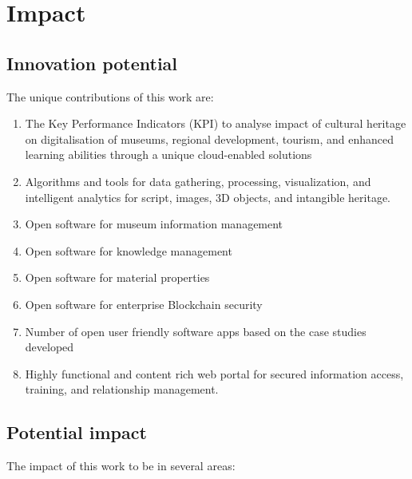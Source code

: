 %
\clearpage
\section{Impact}
\subsection{Innovation potential}
The unique contributions of this work are:
\begin{enumerate}[nosep]
\item The Key Performance Indicators (KPI) to analyse impact of cultural heritage on digitalisation of museums, regional development, tourism, and enhanced learning abilities through a unique cloud-enabled solutions
\item Algorithms and tools for data gathering, processing, visualization, and intelligent  analytics for script, images, 3D objects, and intangible heritage.
\item Open software for museum information management
\item Open software for knowledge management
\item Open software for material properties
\item Open software for enterprise Blockchain security
\item Number of open user friendly software apps based on the case studies developed
\item Highly functional and content rich web portal for secured information access, training, and relationship management.
\end{enumerate}


\subsection{Potential  impact}
The impact of this work to be in several areas:

